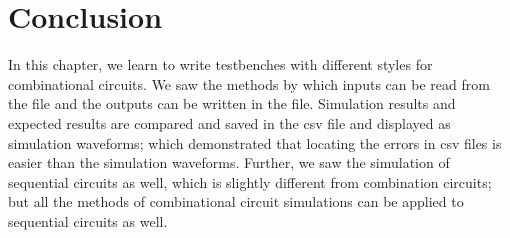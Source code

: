 \section{Conclusion}
In this chapter, we learn to write testbenches with different styles for combinational circuits. We saw the methods by which inputs can be read from the file and the outputs can be written in the file. Simulation results and expected results are compared and saved in the csv file and displayed as simulation waveforms; which demonstrated that locating the errors in csv files is easier than the simulation waveforms. Further, we saw the simulation of sequential circuits as well, which is slightly different from combination circuits; but all the methods of combinational circuit simulations can be applied to sequential circuits as well. 